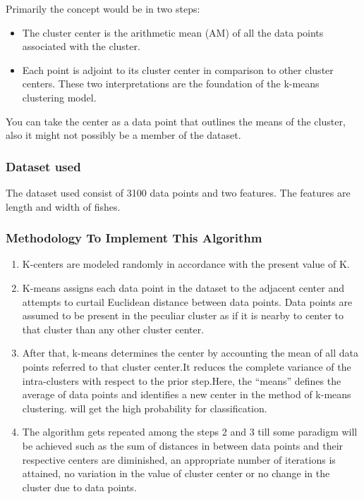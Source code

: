 \documentclass[12pt,a4paper]{article}
\begin{document}
\quad Primarily the concept would be in two steps: 
\begin{itemize}
    \item The cluster center is the arithmetic mean (AM) of all the data points associated with the cluster.
    \item Each point is adjoint to its cluster center in comparison to other cluster centers. These two interpretations are the foundation of the k-means clustering model. 
\end{itemize}
     

\quad You can take the center as a data point that outlines the means of the cluster, also it might not possibly be a member of the dataset.


\subsubsection{Dataset used}

\quad \quad The dataset used consist of 3100 data points and two features. The features are length and width of fishes.

\subsubsection{Methodology To Implement This Algorithm}

\begin{enumerate}
    \item K-centers are modeled randomly in accordance with the present value of K. 
    \item K-means assigns each data point in the dataset to the adjacent center and attempts to curtail Euclidean distance between data points. Data points are assumed to be present in the peculiar cluster as if it is nearby to center to that cluster than any other cluster center.
    \item After that, k-means determines the center by accounting the mean of all data points referred to that cluster center.It reduces the complete variance of the intra-clusters with respect to the prior step.Here, the “means” defines the average of data points and identifies a new center in the method of k-means clustering.  will get the high probability for classification. 
    \item The algorithm gets repeated among the steps 2 and 3 till some paradigm will be achieved such as the sum of distances in between data points and their respective centers are diminished, an appropriate number of iterations is attained, no variation in the value of cluster center or no change in the cluster due to data points. 
\end{enumerate}
\end{document}
